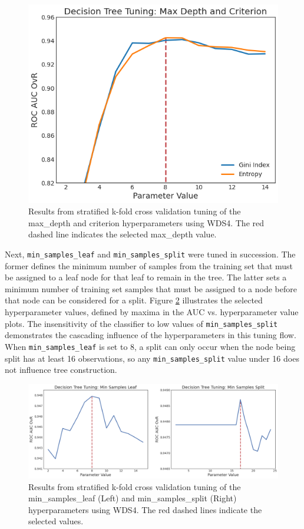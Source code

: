 \begin{figure}[!htp]
\centering
\includegraphics[width=.6\textwidth]{templates/images/Figure-DT_tuning_maxdepth_criterion.png}
\caption[Decision tree max depth tuning]{Results from stratified k-fold cross validation tuning of the max\_depth and criterion hyperparameters using WDS4. The red dashed line indicates the selected max\_depth value.}
\label{fig:dtree_maxdepth}
\end{figure}

Next, \verb|min_samples_leaf| and \verb|min_samples_split| were tuned in succession. The former defines the minimum number of samples from the training set that must be assigned to a leaf node for that leaf to remain in the tree. The latter sets a minimum number of training set samples that must be assigned to a node before that node can be considered for a split. Figure \ref{fig:dtree_min_samples} illustrates the selected hyperparameter values, defined by maxima in the AUC vs. hyperparameter value plots. The insensitivity of the classifier to low values of \verb|min_samples_split| demonstrates the cascading influence of the hyperparameters in this tuning flow. When \verb|min_samples_leaf| is set to 8, a split can only occur when the node being split has at least 16 observations, so any \verb|min_samples_split| value under 16 does not influence tree construction. 

\begin{figure}[!htp]
\centering
\includegraphics[width=\textwidth]{templates/images/Figure-DT_tuning_min_samp_leaf_split.png}
\caption[Decision tree min samples tuning]{Results from stratified k-fold cross validation tuning of the min\_samples\_leaf (Left) and min\_samples\_split (Right) hyperparameters using WDS4. The red dashed lines indicate the selected values.}
\label{fig:dtree_min_samples}
\end{figure}

